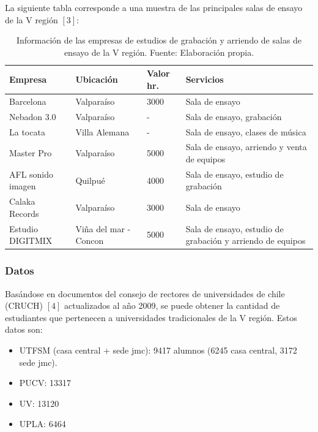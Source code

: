 	La siguiente tabla corresponde a una muestra de las principales salas de ensayo de la V región $[3]$: 
\begin{table}[h!]
\centering
	\begin{tabular}{|l|l|l|p{5cm}|}
	\hline
	\textbf{Empresa} & \textbf{Ubicación}  & \textbf{Valor hr.} & \textbf{Servicios}\\
	\hline
	Barcelona & Valparaíso & 3000 & Sala de ensayo\\
	\hline
	Nebadon 3.0 & Valparaíso & - & Sala de ensayo, grabación \\
	\hline
	La tocata & Villa Alemana & - & Sala de ensayo, clases de música\\
	\hline	
	Master Pro & Valparaíso & 5000 & Sala de ensayo, arriendo y venta de equipos\\
	\hline
	AFL sonido imagen & Quilpué  & 4000 & Sala de ensayo, estudio de grabación\\
	\hline
	Calaka Records & Valparaíso& 3000 & Sala de ensayo\\
	\hline	
	Estudio DIGITMIX & Viña del mar - Concon & 5000 & Sala de ensayo, estudio de grabación y arriendo de equipos\\
	\hline	
	\end{tabular}
\caption[Información de las empresas de estudios de grabación y arriendo de
salas de ensayo de la V región]
{Información de las empresas de estudios de grabación y arriendo de
salas de ensayo de la V región. Fuente: Elaboración propia.}


\end{table}

\subsubsection{Datos}


Basándose en documentos del consejo de rectores de universidades de chile 
(CRUCH) $[4]$ actualizados al año 2009, se puede obtener la cantidad de estudiantes 
que pertenecen a universidades tradicionales de la V región. Estos datos son:

\begin{itemize}
    \item UTFSM (casa central + sede jmc): 9417 alumnos (6245 casa central, 3172 sede jmc).
    \item PUCV: 13317
    \item UV: 13120
    \item UPLA: 6464
\end{itemize}

